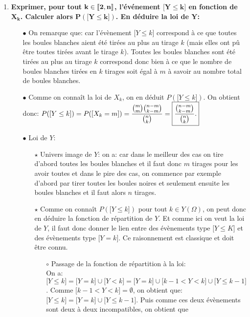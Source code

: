 \documentclass[a4paper, 11pt,reqno]{article}
\begin{document}
\begin{correction}
\begin{enumerate}
		\item \textbf{Exprimer, pour tout $\mathbf{k\in\llbracket  2,n\rrbracket}$, l'\'ev\'enement $\mathbf{\lbrack Y\leq k\rbrack}$ en fonction de $\mathbf{X_k}$. Calculer alors $\mathbf{P(\lbrack Y\leq k\rbrack)}$. En d\'eduire la loi de $\mathbf{Y}$:}
		      \begin{itemize}
			      \item[$\bullet$] On remarque que:  car l'\'ev\`{e}nement $\lbrack Y\leq k\rbrack$ correspond \`{a} ce que toutes les boules blanches aient \'et\'e tir\'ees au plus au tirage $k$ (mais elles ont p\^{u} \^{e}tre toutes tir\'ees avant le tirage $k$). Toutes les boules blanches sont \'et\'e tir\'ees au plus au tirage $k$ correspond donc bien \`{a} ce que le nombre de boules blanches tir\'ees en $k$ tirages soit \'egal \`{a} $m$ \`{a} savoir au nombre total de boules blanches.
			      \item[$\bullet$] Comme on conna\^{i}t la loi de $X_k$, on en d\'eduit $P(\lbrack Y\leq k\rbrack)$. On obtient donc:
				      $P(\lbrack Y\leq k\rbrack)=P(\lbrack X_k=m\rbrack)=\displaystyle\frac{  \binom{m}{m}  \binom{n-m}{k-m} }{  \binom{n}{k}  }=\fbox{$\displaystyle\frac{ \binom{n-m}{k-m} }{  \binom{n}{k}  }$.}$
			      \item[$\bullet$] Loi de $Y$:
				      \begin{itemize}
					      \item[$\star$] Univers image de $Y$: on a:  car dans le meilleur des cas on tire d'abord toutes les boules blanches et il faut donc $m$ tirages pour les avoir toutes et dans le pire des cas, on commence par exemple d'abord par tirer toutes les boules noires et seulement ensuite les boules blanches et il faut alors $n$ tirages.
					      \item[$\star$] Comme on conna\^{i}t $P(\lbrack Y\leq k \rbrack)$ pour tout $k\in Y(\Omega)$, on peut donc en d\'eduire la fonction de r\'epartition de $Y$. Et comme ici on veut la loi de $Y$, il faut donc donner le lien entre des \'ev\`{e}nements type $\lbrack Y\leq K\rbrack$ et des \'ev\`{e}nements type $\lbrack Y=k\rbrack$. Ce raisonnement est classique et doit \^{e}tre connu.
						      \begin{itemize}
							      \item[$\circ$] Passage de la fonction de r\'epartition \`{a} la loi:\\
								      \noindent On a: $\lbrack Y\leq k\rbrack=\lbrack Y=k\rbrack\cup \lbrack Y<k\rbrack=\lbrack Y=k\rbrack\cup \lbrack k-1<Y<k\rbrack\cup \lbrack Y\leq k-1\rbrack$. Comme $ \lbrack k-1<Y<k\rbrack=\emptyset$, on obtient que: $\lbrack Y\leq k\rbrack=\lbrack Y=k\rbrack\cup \lbrack Y\leq k-1\rbrack$. Puis comme ces deux \'ev\`{e}nements sont deux \`{a} deux incompatibles, on obtient que

\end{itemize}
\end{itemize}
\end{itemize}
\end{enumerate}
\end{correction}
\end{document}
